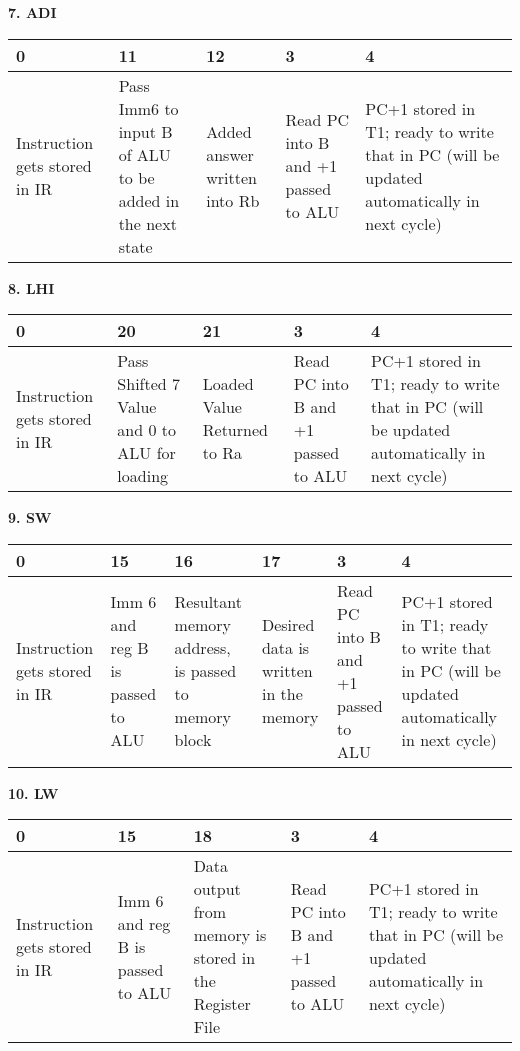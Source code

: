 \documentclass[11pt,fleqn,oneside]{book} %
\begin{document}
\vspace{0.5cm}

\textbf{7. ADI }
\begin{center}
 \begin{tabular}{ | m{5em} | m{5em} | m{7em} | m{5em} | m{8em} | } 
 \hline
 0 & 11 & 12 & 3 & 4 \\ [0.5ex]
 \hline
 Instruction gets stored in IR & Pass Imm6 to input B of ALU to be added in the next state & Added answer written into Rb & Read PC into B and +1 passed to ALU & PC+1 stored in T1; ready to write that in PC (will be updated automatically in next cycle)\\ [1ex]
 \hline
\end{tabular}
\end{center}

\vspace{0.5cm}

\textbf{8. LHI }
\begin{center}
 \begin{tabular}{ | m{5em} | m{5em} | m{7em} | m{5em} | m{8em} | } 
 \hline
 0 & 20 & 21 & 3 & 4 \\ [0.5ex]
 \hline
 Instruction gets stored in IR & Pass Shifted 7 Value and 0 to ALU for loading & Loaded Value Returned to Ra & Read PC into B and +1 passed to ALU & PC+1 stored in T1; ready to write that in PC (will be updated automatically in next cycle)\\ [1ex]
 \hline
\end{tabular}
\end{center}

\vspace{1cm}

\textbf{9. SW }
\begin{center}
 \begin{tabular}{ | m{5em} | m{5em} | m{7em} | m{5em} | m{5em} | m{7em} | } 
 \hline
 0 & 15 & 16 & 17 & 3 & 4 \\ [0.5ex]
 \hline
 Instruction gets stored in IR & Imm 6 and reg B is passed to ALU & Resultant memory address, is passed to memory block & Desired data is written in the memory & Read PC into B and +1 passed to ALU & PC+1 stored in T1; ready to write that in PC (will be updated automatically in next cycle)\\ [1ex]
 \hline
\end{tabular}
\end{center}

\newpage

\textbf{10. LW }
\begin{center}
 \begin{tabular}{ | m{5em} | m{7em} | m{5em} | m{5em} | m{7em} | } 
 \hline
 0 & 15 & 18 & 3 & 4 \\ [0.5ex]
 \hline
 Instruction gets stored in IR & Imm 6 and reg B is passed to ALU & Data output from memory is stored in the Register File & Read PC into B and +1 passed to ALU & PC+1 stored in T1; ready to write that in PC (will be updated automatically in next cycle)\\ [1ex]
 \hline
\end{tabular}
\end{center}
\end{document}
